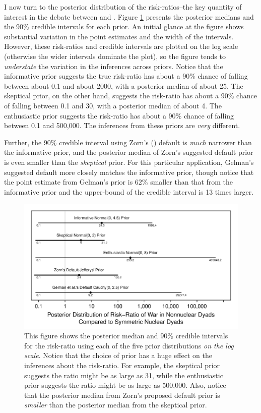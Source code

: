 \documentclass[12pt]{article}
\begin{document}
I now turn to the posterior distribution of the risk-ratios--the key quantity of interest in the debate between \cite{BellMiller2015} and \cite{Rauchhaus2009}. 
Figure \ref{fig:bm-rr} presents the posterior medians and the 90\% credible intervals for each prior. 
An initial glance at the figure shows substantial variation in the point estimates and the width of the intervals. 
However, these risk-ratios and credible intervals are plotted on the log scale (otherwise the wider intervals dominate the plot), so the figure tends to \textit{understate} the variation in the inferences across priors. 
Notice that the informative prior suggests the true risk-ratio has about a 90\% chance of falling between about 0.1 and about 2000, with a posterior median of about 25.
The skeptical prior, on the other hand, suggests the risk-ratio has about a 90\% chance of falling between 0.1 and 30, with a posterior median of about 4. 
The enthusiastic prior suggests the risk-ratio has about a 90\% chance of falling between 0.1 and 500,000. 
The inferences from these priors are \emph{very} different. 

Further, the 90\% credible interval using Zorn's (\citeyear{Zorn2005}) default is \emph{much} narrower than the informative prior, and the posterior median of Zorn's suggested default prior is even smaller than the \emph{skeptical} prior. 
For this particular application, Gelman's suggested default more closely matches the informative prior, though notice that the point estimate from Gelman's prior is 62\% smaller than that from the informative prior and the upper-bound of the credible interval is 13 times larger.

\begin{figure}[H]
\begin{center}
\includegraphics[scale = .8]{figs/bm-rr.pdf}
\caption{This figure shows the posterior median and 90\% credible intervals for the risk-ratio using each of the five prior distributions \emph{on the log scale}. 
Notice that the choice of prior has a huge effect on the inferences about the risk-ratio. 
For example, the skeptical prior suggests the ratio might be as large as 31, while the enthusiastic prior suggests the ratio might be as large as 500,000. 
Also, notice that the posterior median from Zorn's proposed default prior is \emph{smaller} than the posterior median from the skeptical prior.}\label{fig:bm-rr}
\end{center}
\end{figure}
\end{document}
